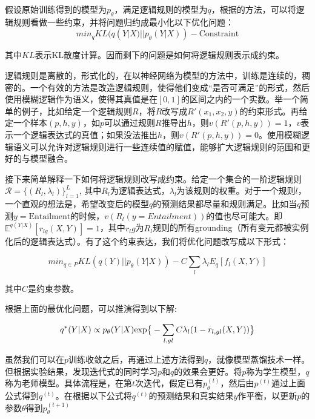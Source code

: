 \documentclass[UTF8,11pt,a4paper,nofonts]{ctexart}
\begin{document}
假设原始训练得到的模型为$p_\theta$，满足逻辑规则的模型为$q$，根据\cite{Hu2016HarnessingDN}的方法，可以将逻辑规则看做一些约束，并将问题归约成最小化以下优化问题：
\begin{equation}
min_{q} KL(q(Y|X) || p_\theta(Y|X)) - \text{Constraint}
\end{equation}

其中$KL$表示KL散度计算\cite{}。因而剩下的问题是如何将逻辑规则表示成约束。

逻辑规则是离散的，形式化的，在以神经网络为模型的方法中，训练是连续的，稠密的。一个有效的方法是改造逻辑规则，使得他们变成“是否可满足”的形式，然后使用模糊逻辑作为语义，使得其真值是在$[0,1]$的区间之内的一个实数。举一个简单的例子，比如给定一个逻辑规则$R$，将$R$改写成$R'(x_1,x_2,y)$的约束形式。再给定一个样本$(p,h,y)$，如$p$可以通过规则$R$推导出$h$，则$v(R'(p,h,y))=1$，$v$表示一个逻辑表达式的真值；如果没法推出$h$，则$v(R'(p,h,y))=0$。使用模糊逻辑语义可以允许对逻辑规则进行一些连续值的赋值，能够扩大逻辑规则的范围和更好的与模型融合。

接下来简单解释一下如何将逻辑规则改写成约束。给定一个集合的一阶逻辑规则$\mathcal{R}=\{(R_l,\lambda_l)\}^L_{l=1}$, 其中$R_l$为逻辑表达式，$\lambda_l$为该规则的权重。对于一个规则$l$，一个直观的想法是，希望改变后的模型$q$的预测结果都尽量和规则满足。比如当$q$预测$y=\text{Entailment}$的时候，$v(R_l(y=Entailment))$的值也尽可能大。即$\mathbb{E}^{q(Y|X)}[r_{lg}(X,Y)]=1$，其中$r_lg$为$R_l$规则的所有grounding（所有变元都被实例化后的逻辑表达式）。有了这个约束表达，我们将优化问题改写成以下形式：

\begin{equation}
min_{q \in P} KL(q(Y)|| p_\theta(Y|X)) - C \sum_l \lambda_l E_q[f_l(X,Y)]
\end{equation}

其中$C$是约束参数。

根据上面的最优化问题，可以推演得到以下解\cite{Hu2016HarnessingDN}:

\begin{equation}
q^*(Y|X) \propto p_\theta(Y|X) \text{exp} \big{\{} -\sum_{l,gl}C\lambda_l(1-r_{l,gl}(X,Y)) \big{\}}
\end{equation}

虽然我们可以在$p$训练收敛之后，再通过上述方法得到$q$，就像模型蒸馏技术\cite{Hinton2015DistillingTK, LopezPaz2015UnifyingDA}一样。但根据实验结果，发现迭代式的同时学习$p$和$q$的效果会更好。\cite{Hu2016HarnessingDN}将$p$称为学生模型，$q$称为老师模型。具体流程是，在第$t$次迭代，假定已有$p_\theta^{(t)}$，然后由$p^{(t)}$通过上面公式得到$q^{(t)}$。在根据以下公式将$q^{(t)}$的预测结果和真实结果$y$作平衡，以更新$p$的参数$\theta$得到$p_\theta^{(t+1)}$
\end{document}
